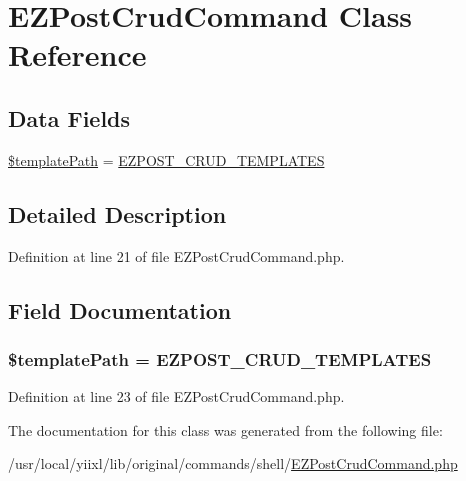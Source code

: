 \hypertarget{classEZPostCrudCommand}{
\section{EZPostCrudCommand Class Reference}
\label{classEZPostCrudCommand}
}
\subsection*{Data Fields}
\begin{DoxyCompactItemize}
\item 
\hyperlink{classEZPostCrudCommand_a719e40b65e19fd7c0bc1c2d971dd53ab}{\$templatePath} = \hyperlink{EZPostCrudCommand_8php_a18cad219e51332ab69d12391c75f8d41}{EZPOST\_\-CRUD\_\-TEMPLATES}
\end{DoxyCompactItemize}


\subsection{Detailed Description}


Definition at line 21 of file EZPostCrudCommand.php.



\subsection{Field Documentation}
\hypertarget{classEZPostCrudCommand_a719e40b65e19fd7c0bc1c2d971dd53ab}{
\subsubsection[{\$templatePath}]{\setlength{\rightskip}{0pt plus 5cm}\$templatePath = {\bf EZPOST\_\-CRUD\_\-TEMPLATES}}}
\label{classEZPostCrudCommand_a719e40b65e19fd7c0bc1c2d971dd53ab}


Definition at line 23 of file EZPostCrudCommand.php.



The documentation for this class was generated from the following file:\begin{DoxyCompactItemize}
\item 
/usr/local/yiixl/lib/original/commands/shell/\hyperlink{EZPostCrudCommand_8php}{EZPostCrudCommand.php}\end{DoxyCompactItemize}
